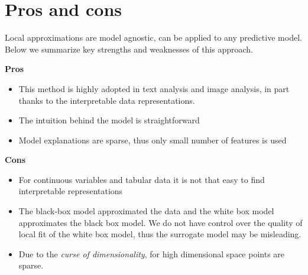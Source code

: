 \documentclass[]{book}
\newenvironment{Shaded}{\begin{snugshade}}{\end{snugshade}}
\newcommand{\DataTypeTok}[1]{\textcolor[rgb]{0.13,0.29,0.53}{#1}}
\newcommand{\DecValTok}[1]{\textcolor[rgb]{0.00,0.00,0.81}{#1}}
\newcommand{\KeywordTok}[1]{\textcolor[rgb]{0.13,0.29,0.53}{\textbf{#1}}}
\newcommand{\NormalTok}[1]{#1}
\newcommand{\OperatorTok}[1]{\textcolor[rgb]{0.81,0.36,0.00}{\textbf{#1}}}
\newcommand{\StringTok}[1]{\textcolor[rgb]{0.31,0.60,0.02}{#1}}
\providecommand{\tightlist}{%
  \setlength{\itemsep}{0pt}\setlength{\parskip}{0pt}}
\theoremstyle{definition}
\theoremstyle{definition}
\theoremstyle{definition}
\theoremstyle{remark}
\begin{document}
\begin{Shaded}
\end{Shaded}

\hypertarget{pros-and-cons-3}{%
\section{Pros and cons}\label{pros-and-cons-3}}

Local approximations are model agnostic, can be applied to any
predictive model. Below we summarize key strengths and weaknesses of
this approach.

\textbf{Pros}

\begin{itemize}
\tightlist
\item
  This method is highly adopted in text analysis and image analysis, in
  part thanks to the interpretable data representations.
\item
  The intuition behind the model is straightforward
\item
  Model explanations are sparse, thus only small number of features is
  used
\end{itemize}

\textbf{Cons}

\begin{itemize}
\tightlist
\item
  For continuous variables and tabular data it is not that easy to find
  interpretable representations
\item
  The black-box model approximated the data and the white box model
  approximates the black box model. We do not have control over the
  quality of local fit of the white box model, thus the surrogate model
  may be misleading.
\item
  Due to the \emph{curse of dimensionality}, for high dimensional space
  points are sparse.
\end{itemize}
\end{document}
